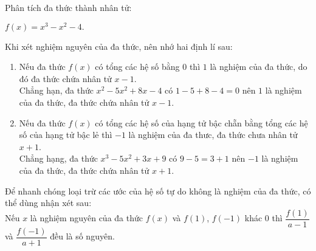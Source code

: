 \begin{vd}%
	Phân tích đa thức thành nhân tử:
	\begin{center}
		$f(x)=x^3-x^2-4.$
	\end{center}
\end{vd}
	\begin{nx}
		Khi xét nghiệm nguyên của đa thức, nên nhớ hai định lí sau:
		\begin{enumerate}
			\item Nếu đa thức $f(x)$ có tổng các hệ số bằng $0$ thì $1$ là nghiệm của đa thức, do đó đa thức chứa nhân tử $x-1$.\\
			Chẳng hạn, đa thức $x^2-5x^2+8x-4$ có $1-5+8-4=0$ nên $1$ là nghiệm của đa thức, đa thức chứa nhân tử $x-1$.
			\item Nếu đa thức $f(x)$ có tổng các hệ số của hạng tử bậc chẵn bằng tổng các hệ số của hạng tử bậc lẻ thì $-1$ là nghiệm của đa thưc, đa thức chưa nhân tử $x+1$.\\
			Chẳng hạng, đa thức $x^3-5x^2+3x+9$ có $9-5=3+1$ nên $-1$ là nghiệm của đa thức, đa thức chứa nhân tử $x+1$.
		\end{enumerate}
	\end{nx}
\begin{nx}
	Để nhanh chóng loại trừ các ước của hệ số tự do không là nghiệm của đa thức, có thể dùng nhận xét sau:\\Nếu $x$ là nghiệm nguyên của đa thức $f(x)$ và $f(1)$, $f(-1)$ khác $0$ thì $\dfrac{f(1)}{a-1}$ và $\dfrac{f(-1)}{a+1}$ đều là số nguyên.
\end{nx}
